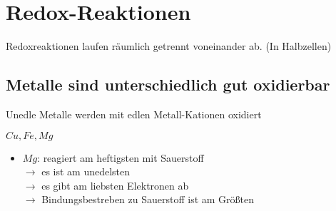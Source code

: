 
\section{Redox-Reaktionen}

Redoxreaktionen laufen räumlich getrennt voneinander ab. (In Halbzellen)

\subsection{Metalle sind unterschiedlich gut oxidierbar}

Unedle Metalle werden mit edlen Metall-Kationen oxidiert

$Cu, Fe, Mg$
\begin{itemize}
    \item $Mg$: reagiert am heftigsten mit Sauerstoff \\
        $\rightarrow$ es ist am unedelsten \\
        $\rightarrow$ es gibt am liebsten Elektronen ab \\
        $\rightarrow$ Bindungsbestreben zu Sauerstoff ist am Größten
\end{itemize}

